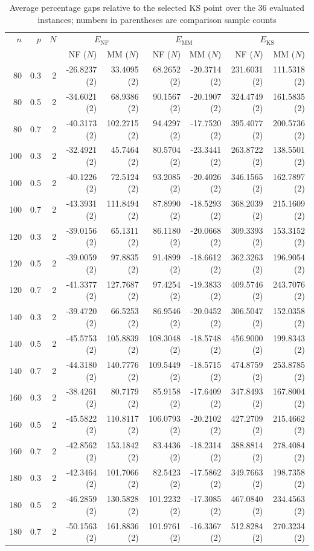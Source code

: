 \begin{table}[ht!]
\centering
\caption{Average percentage gaps relative to the selected KS point over the 36 evaluated instances; numbers in parentheses are comparison sample counts}
\begin{tabular}{rrr rrr rrr}
\toprule
$n$ & $p$ & $N$ & \multicolumn{2}{c}{$E_{\mathrm{NF}}$} & \multicolumn{2}{c}{$E_{\mathrm{MM}}$} & \multicolumn{2}{c}{$E_{\mathrm{KS}}$} \\
 & & & NF ($N$) & MM ($N$) & NF ($N$) & MM ($N$) & NF ($N$) & MM ($N$) \\
\midrule
80 & 0.3 & 2 & -26.8237 (2) & 33.4095 (2) & 68.2652 (2) & -20.3714 (2) & 231.6031 (2) & 111.5318 (2) \\
80 & 0.5 & 2 & -34.6021 (2) & 68.9386 (2) & 90.1567 (2) & -20.1907 (2) & 324.4749 (2) & 161.5835 (2) \\
80 & 0.7 & 2 & -40.3173 (2) & 102.2715 (2) & 94.4297 (2) & -17.7520 (2) & 395.4077 (2) & 200.5736 (2) \\
100 & 0.3 & 2 & -32.4921 (2) & 45.7464 (2) & 80.5704 (2) & -23.3441 (2) & 263.8722 (2) & 138.5501 (2) \\
100 & 0.5 & 2 & -40.1226 (2) & 72.5124 (2) & 93.2085 (2) & -20.4026 (2) & 346.1565 (2) & 162.7897 (2) \\
100 & 0.7 & 2 & -43.3931 (2) & 111.8494 (2) & 87.8990 (2) & -18.5293 (2) & 368.2039 (2) & 215.1609 (2) \\
120 & 0.3 & 2 & -39.0156 (2) & 65.1311 (2) & 86.1180 (2) & -20.0668 (2) & 309.3393 (2) & 153.3152 (2) \\
120 & 0.5 & 2 & -39.0059 (2) & 97.8835 (2) & 91.4899 (2) & -18.6612 (2) & 362.3263 (2) & 196.9054 (2) \\
120 & 0.7 & 2 & -41.3377 (2) & 127.7687 (2) & 97.4254 (2) & -19.3833 (2) & 409.5746 (2) & 243.7076 (2) \\
140 & 0.3 & 2 & -39.4720 (2) & 66.5253 (2) & 86.9546 (2) & -20.0452 (2) & 306.5047 (2) & 152.0358 (2) \\
140 & 0.5 & 2 & -45.5753 (2) & 105.8839 (2) & 108.3048 (2) & -18.5748 (2) & 456.9000 (2) & 199.8343 (2) \\
140 & 0.7 & 2 & -44.3180 (2) & 140.7776 (2) & 109.5449 (2) & -18.5715 (2) & 474.8759 (2) & 253.8785 (2) \\
160 & 0.3 & 2 & -38.4261 (2) & 80.7179 (2) & 85.9158 (2) & -17.6409 (2) & 347.8493 (2) & 167.8004 (2) \\
160 & 0.5 & 2 & -45.5822 (2) & 110.8117 (2) & 106.0793 (2) & -20.2102 (2) & 427.2709 (2) & 215.4662 (2) \\
160 & 0.7 & 2 & -42.8562 (2) & 153.1842 (2) & 83.4436 (2) & -18.2314 (2) & 388.8814 (2) & 278.4084 (2) \\
180 & 0.3 & 2 & -42.3464 (2) & 101.7066 (2) & 82.5423 (2) & -17.5862 (2) & 349.7663 (2) & 198.7358 (2) \\
180 & 0.5 & 2 & -46.2859 (2) & 130.5828 (2) & 101.2232 (2) & -17.3085 (2) & 467.0840 (2) & 234.4563 (2) \\
180 & 0.7 & 2 & -50.1563 (2) & 161.8836 (2) & 101.9761 (2) & -16.3367 (2) & 512.8284 (2) & 270.3234 (2) \\
\bottomrule
\end{tabular}
\end{table}
